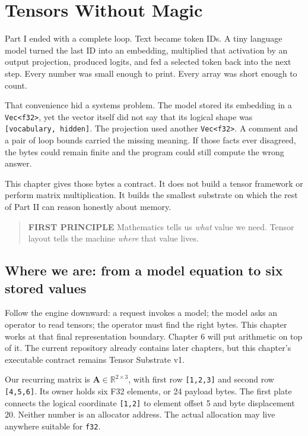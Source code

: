 \chapter{Tensors Without Magic}\label{chapter-5-tensors-without-magic}
Part I ended with a complete loop. Text became token IDs. A tiny
language model turned the last ID into an embedding, multiplied that
activation by an output projection, produced logits, and fed a selected
token back into the next step. Every number was small enough to print.
Every array was short enough to count.

That convenience hid a systems problem. The model stored its embedding
in a \texttt{Vec\textless{}f32\textgreater{}}, yet the vector itself did
not say that its logical shape was \texttt{{[}vocabulary,\ hidden{]}}.
The projection used another \texttt{Vec\textless{}f32\textgreater{}}. A
comment and a pair of loop bounds carried the missing meaning. If those
facts ever disagreed, the bytes could remain finite and the program
could still compute the wrong answer.

This chapter gives those bytes a contract. It does not build a tensor
framework or perform matrix multiplication. It builds the smallest
substrate on which the rest of Part II can reason honestly about memory.

\begin{quote}
\textbf{FIRST PRINCIPLE} Mathematics tells us \emph{what} value we need.
Tensor layout tells the machine \emph{where} that value lives.
\end{quote}

\section{Where we are: from a model equation to six stored
values}\label{where-we-are-from-a-model-equation-to-six-stored-values}

Follow the engine downward: a request invokes a model; the model asks an
operator to read tensors; the operator must find the right bytes. This
chapter works at that final representation boundary. Chapter 6 will put
arithmetic on top of it. The current repository already contains later
chapters, but this chapter's executable contract remains Tensor
Substrate v1.


Our recurring matrix is \(\mathbf{A}\in\mathbb{R}^{2\times3}\), with
first row \texttt{{[}1,2,3{]}} and second row \texttt{{[}4,5,6{]}}. Its
owner holds six F32 elements, or 24 payload bytes. The first plate
connects the logical coordinate \texttt{{[}1,2{]}} to element offset 5
and byte displacement 20. Neither number is an allocator address. The
actual allocation may live anywhere suitable for \texttt{f32}.

